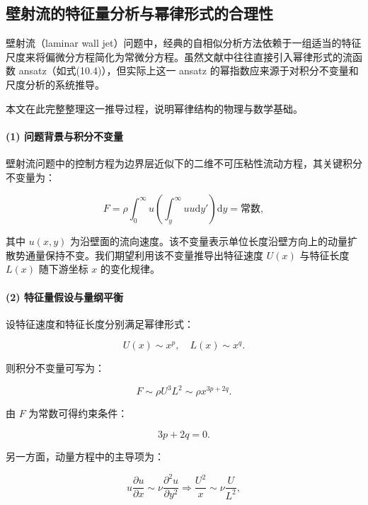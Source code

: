 
\subsection*{壁射流的特征量分析与幂律形式的合理性}

壁射流（laminar wall jet）问题中，经典的自相似分析方法依赖于一组适当的特征尺度来将偏微分方程简化为常微分方程。虽然文献中往往直接引入幂律形式的流函数 ansatz（如式(10.4)），但实际上这一 ansatz 的幂指数应来源于对积分不变量和尺度分析的系统推导。

本文在此完整整理这一推导过程，说明幂律结构的物理与数学基础。

\paragraph{(1) 问题背景与积分不变量}

壁射流问题中的控制方程为边界层近似下的二维不可压粘性流动方程，其关键积分不变量为：

\begin{equation}
F=\rho\int_{0}^{\infty}u\left(\int_{y}^{\infty}uu\mathrm{d}y'\right)\mathrm{d}y = \text{常数},
\end{equation}

其中 \( u(x,y) \) 为沿壁面的流向速度。该不变量表示单位长度沿壁方向上的动量扩散势通量保持不变。我们期望利用该不变量推导出特征速度 \( U(x) \) 与特征长度 \( L(x) \) 随下游坐标 \( x \) 的变化规律。

\paragraph{(2) 特征量假设与量纲平衡}

设特征速度和特征长度分别满足幂律形式：

\begin{equation}
U(x) \sim x^p, \quad L(x) \sim x^q.
\end{equation}

则积分不变量可写为：

\begin{equation}
F \sim \rho U^3 L^2 \sim \rho x^{3p + 2q}.
\end{equation}

由 \( F \) 为常数可得约束条件：

\begin{equation}
3p + 2q = 0. \tag{A}
\end{equation}

另一方面，动量方程中的主导项为：

\begin{equation}
u \frac{\partial u}{\partial x} \sim \nu \frac{\partial^2 u}{\partial y^2}
\Rightarrow \frac{U^2}{x} \sim \nu \frac{U}{L^2},
\end{equation}

